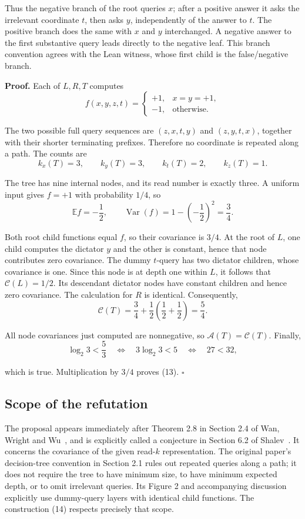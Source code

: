 \documentclass[
  american,
  11pt,
]{article}
\begin{document}
Thus the negative branch of the root queries \(x\); after a positive
answer it asks the irrelevant coordinate \(t\), then asks \(y\),
independently of the answer to \(t\). The positive branch does the same
with \(x\) and \(y\) interchanged. A negative answer to the first
substantive query leads directly to the negative leaf. This branch
convention agrees with the Lean witness, whose first child is the
false/negative branch.

\textbf{Proof.} Each of \(L,R,T\) computes \[
f(x,y,z,t)=
\begin{cases}
+1,&x=y=+1,\\
-1,&\text{otherwise}.
\end{cases}
\tag{15}
\]

The two possible full query sequences are \((z,x,t,y)\) and
\((z,y,t,x)\), together with their shorter terminating prefixes.
Therefore no coordinate is repeated along a path. The counts are \[
k_x(T)=3,\qquad k_y(T)=3,\qquad
k_t(T)=2,\qquad k_z(T)=1.
\tag{16}
\]

The tree has nine internal nodes, and its read number is exactly three.
A uniform input gives \(f=+1\) with probability \(1/4\), so \[
\mathbb E f=-\frac12,\qquad
\operatorname{Var}(f)=1-\left(-\frac12\right)^2=\frac34.
\tag{17}
\]

Both root child functions equal \(f\), so their covariance is \(3/4\).
At the root of \(L\), one child computes the dictator \(y\) and the
other is constant, hence that node contributes zero covariance. The
dummy \(t\)-query has two dictator children, whose covariance is one.
Since this node is at depth one within \(L\), it follows that
\(\mathcal C(L)=1/2\). Its descendant dictator nodes have constant
children and hence zero covariance. The calculation for \(R\) is
identical. Consequently, \[
\mathcal C(T)=\frac34+\frac12\left(\frac12+\frac12\right)=\frac54.
\tag{18}
\]

All node covariances just computed are nonnegative, so
\(\mathcal A(T)=\mathcal C(T)\). Finally, \[
\log_2 3<\frac53
\quad\Longleftrightarrow\quad
3\log_2 3<5
\quad\Longleftrightarrow\quad
27<32,
\]

which is true. Multiplication by \(3/4\) proves (13). \(\square\)

\subsection{Scope of the refutation}\label{scope-of-the-refutation}

The proposal appears immediately after Theorem 2.8 in Section 2.4 of
Wan, Wright and Wu~\cite{WWW}, and is explicitly called a conjecture in
Section 6.2 of Shalev~\cite{Shalev}. It concerns the covariance of the
given read-\(k\) representation. The original paper's decision-tree
convention in Section 2.1 rules out repeated queries along a path; it
does not require the tree to have minimum size, to have minimum expected
depth, or to omit irrelevant queries. Its Figure 2 and accompanying
discussion explicitly use dummy-query layers with identical child
functions. The construction (14) respects precisely that scope.
\end{document}
